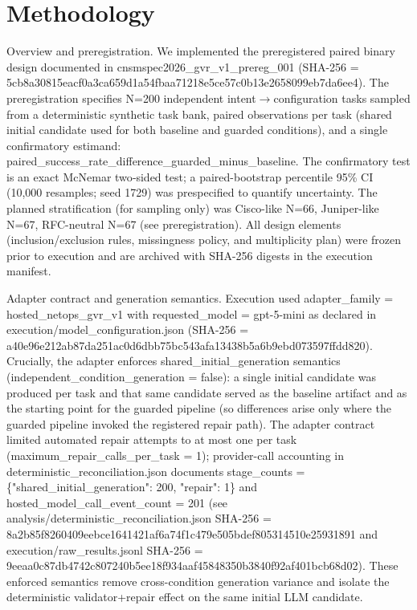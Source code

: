 \documentclass[conference]{IEEEtran}
\begin{document}
\section{Methodology}
Overview and preregistration. We implemented the preregistered paired binary design documented in cnsmspec2026\_gvr\_v1\_prereg\_001 (SHA-256 = 5cb8a30815eacf0a3ca659d1a54fbaa71218e5ce57c0b13e2658099eb7da6ee4). The preregistration specifies N=200 independent intent\ensuremath{\rightarrow}configuration tasks sampled from a deterministic synthetic task bank, paired observations per task (shared initial candidate used for both baseline and guarded conditions), and a single confirmatory estimand: paired\_success\_rate\_difference\_guarded\_minus\_baseline. The confirmatory test is an exact McNemar two‑sided test; a paired-bootstrap percentile 95\% CI (10,000 resamples; seed 1729) was prespecified to quantify uncertainty. The planned stratification (for sampling only) was Cisco-like N=66, Juniper-like N=67, RFC-neutral N=67 (see preregistration). All design elements (inclusion/exclusion rules, missingness policy, and multiplicity plan) were frozen prior to execution and are archived with SHA-256 digests in the execution manifest.

Adapter contract and generation semantics. Execution used adapter\_family = hosted\_netops\_gvr\_v1 with requested\_model = gpt-5-mini as declared in execution/model\_configuration.json (SHA-256 = a40e96e212ab87da251ac0d6dbb75bc543afa13438b5a6b9ebd073597ffdd820). Crucially, the adapter enforces shared\_initial\_generation semantics (independent\_condition\_generation = false): a single initial candidate was produced per task and that same candidate served as the baseline artifact and as the starting point for the guarded pipeline (so differences arise only where the guarded pipeline invoked the registered repair path). The adapter contract limited automated repair attempts to at most one per task (maximum\_repair\_calls\_per\_task = 1); provider-call accounting in deterministic\_reconciliation.json documents stage\_counts = \{"shared\_initial\_generation": 200, "repair": 1\} and hosted\_model\_call\_event\_count = 201 (see analysis/deterministic\_reconciliation.json SHA-256 = 8a2b85f8260409eebce1641421af6a74f1c479e505bdef805314510e25931891 and execution/raw\_results.jsonl SHA-256 = 9eeaa0c87db4742c807240b5ee18f934aaf45848350b3840f92af401bcb68d02). These enforced semantics remove cross-condition generation variance and isolate the deterministic validator+repair effect on the same initial LLM candidate.
\end{document}

